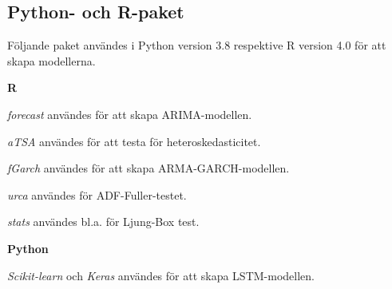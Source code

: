 \documentclass[11pt]{article}
\numberwithin{equation}{section}
\numberwithin{table}{section}
\numberwithin{figure}{section}
\begin{document}
\subsection{Python- och R-paket}
Följande paket användes i Python version 3.8 respektive R version 4.0 för att skapa modellerna. 

\textbf{R} \par
\textit{forecast} användes för att skapa ARIMA-modellen. \par
\textit{aTSA} användes för att testa för heteroskedasticitet. \par
\textit{fGarch} användes för att skapa ARMA-GARCH-modellen. \par
\textit{urca} användes för ADF-Fuller-testet. \par
\textit{stats} användes bl.a. för Ljung-Box test. \par

\textbf{Python} \par
\textit{Scikit-learn} och \textit{Keras} användes för att skapa LSTM-modellen.
\end{document}
